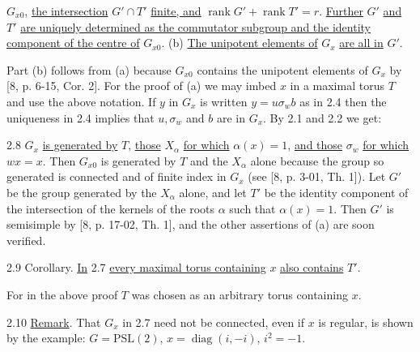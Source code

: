 
$G_{x0}$, \uline{the intersection} $G'\cap T'$ \uline{finite, and} $\operatorname{rank}G'+\operatorname{rank}T'=r$. \uline{Further} $G'$ \uline{and} $T'$ \uline{are uniquely determined as the commutator subgroup and the identity component of the centre of} $G_{x0}$. (b) \uline{The unipotent elements of} $G_x$ \uline{are all in} $G'$.

Part (b) follows from (a) because $G_{x0}$ contains the unipotent elements of $G_x$ by [8, p. 6-15, Cor. 2]. For the proof of (a) we may imbed $x$ in a maximal torus $T$ and use the above notation. If $y$ in $G_x$ is written $y=u\sigma_wb$ as in 2.4 then the uniqueness in 2.4 implies that $u,\sigma_w$ and $b$ are in $G_x$. By 2.1 and 2.2 we get:

2.8 $G_x$ \uline{is generated by} $T$, \uline{those} $X_\alpha$ \uline{for which} $\alpha(x)=1$, \uline{and those} $\sigma_w$ \uline{for which} $wx=x$. Then $G_{x0}$ is generated by $T$ and the $X_\alpha$ alone because the group so generated is connected and of finite index in $G_x$ (see [8, p. 3-01, Th. 1]). Let $G'$ be the group generated by the $X_\alpha$ alone, and let $T'$ be the identity component of the intersection of the kernels of the roots $\alpha$ such that $\alpha(x)=1$. Then $G'$ is semisimple by [8, p. 17-02, Th. 1], and the other assertions of (a) are soon verified.

2.9 Corollary. \uline{In} 2.7 \uline{every maximal torus containing} $x$ \uline{also contains} $T'$.

For in the above proof $T$ was chosen as an arbitrary torus containing $x$.

2.10 \uline{Remark}. That $G_x$ in 2.7 need not be connected, even if $x$ is regular, is shown by the example: $G=\mathrm{PSL}(2)$, $x=\operatorname{diag}(i,-i)$, $i^2=-1$.

